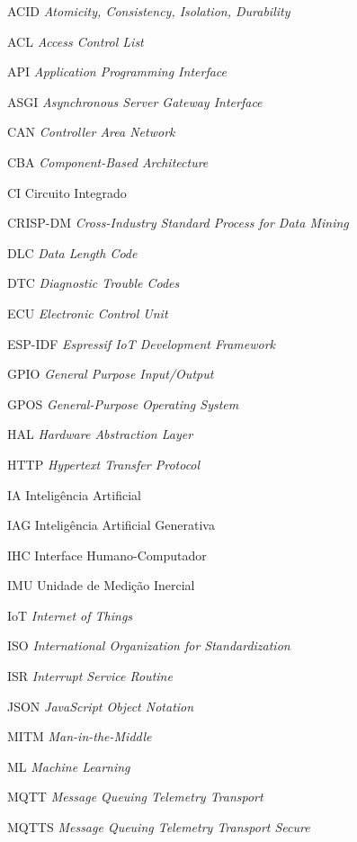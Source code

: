 \documentclass[
	12pt,				%
	openright,			%
	twoside,			%
	a4paper,			%
	english,			%
	brazil				%
	]{abntex2}
\begin{document}
\begin{siglas}
  \item[ACID] \textit{Atomicity, Consistency, Isolation, Durability}
  \item[ACL] \textit{Access Control List}
  \item[API] \textit{Application Programming Interface}
  \item[ASGI] \textit{Asynchronous Server Gateway Interface}
  \item[CAN] \textit{Controller Area Network}
  \item[CBA] \textit{Component-Based Architecture}
  \item[CI] Circuito Integrado
  \item[CRISP-DM] \textit{Cross-Industry Standard Process for Data Mining}
  \item[DLC] \textit{Data Length Code}
  \item[DTC] \textit{Diagnostic Trouble Codes}
  \item[ECU] \textit{Electronic Control Unit}
  \item[ESP-IDF] \textit{Espressif IoT Development Framework}
  \item[GPIO] \textit{General Purpose Input/Output}
  \item[GPOS] \textit{General-Purpose Operating System}
  \item[HAL] \textit{Hardware Abstraction Layer}
  \item[HTTP] \textit{Hypertext Transfer Protocol}
  \item[IA] Inteligência Artificial
  \item[IAG] Inteligência Artificial Generativa
  \item[IHC] Interface Humano-Computador
  \item[IMU] Unidade de Medição Inercial
  \item[IoT] \textit{Internet of Things}
  \item[ISO] \textit{International Organization for Standardization}
  \item[ISR] \textit{Interrupt Service Routine}
  \item[JSON] \textit{JavaScript Object Notation}
  \item[MITM] \textit{Man-in-the-Middle}
  \item[ML] \textit{Machine Learning}
  \item[MQTT] \textit{Message Queuing Telemetry Transport}
  \item[MQTTS] \textit{Message Queuing Telemetry Transport Secure}

\end{siglas}
\end{document}
